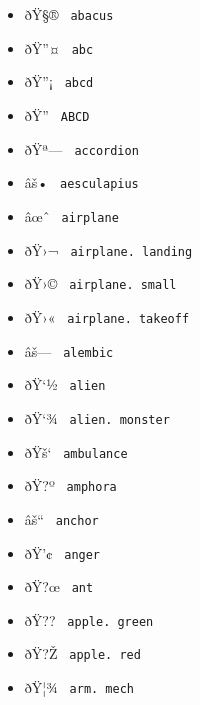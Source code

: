 \begin{itemize}
\tightlist
\item
  \label{symbol-abacus}{{ ðŸ§® } \texttt{\ abacus\ }}
\item
  \label{symbol-abc}{{ ðŸ''¤ } \texttt{\ abc\ }}
\item
  \label{symbol-abcd}{{ ðŸ''¡ } \texttt{\ abcd\ }}
\item
  \label{symbol-ABCD}{{ ðŸ'' } \texttt{\ ABCD\ }}
\item
  \label{symbol-accordion}{{ ðŸª--- }
  \texttt{\ accordion\ }}
\item
  \label{symbol-aesculapius}{{ âš• }
  \texttt{\ aesculapius\ }}
\item
  \label{symbol-airplane}{{ âœˆ } \texttt{\ airplane\ }}
\item
  \label{symbol-airplane.landing}{{ ðŸ›¬ }
  \texttt{\ airplane.\ landing\ }}
\item
  \label{symbol-airplane.small}{{ ðŸ›© }
  \texttt{\ airplane.\ small\ }}
\item
  \label{symbol-airplane.takeoff}{{ ðŸ›« }
  \texttt{\ airplane.\ takeoff\ }}
\item
  \label{symbol-alembic}{{ âš--- } \texttt{\ alembic\ }}
\item
  \label{symbol-alien}{{ ðŸ`½ } \texttt{\ alien\ }}
\item
  \label{symbol-alien.monster}{{ ðŸ`¾ }
  \texttt{\ alien.\ monster\ }}
\item
  \label{symbol-ambulance}{{ ðŸš` }
  \texttt{\ ambulance\ }}
\item
  \label{symbol-amphora}{{ ðŸ?º } \texttt{\ amphora\ }}
\item
  \label{symbol-anchor}{{ âš`` } \texttt{\ anchor\ }}
\item
  \label{symbol-anger}{{ ðŸ'¢ } \texttt{\ anger\ }}
\item
  \label{symbol-ant}{{ ðŸ?œ } \texttt{\ ant\ }}
\item
  \label{symbol-apple.green}{{ ðŸ?? }
  \texttt{\ apple.\ green\ }}
\item
  \label{symbol-apple.red}{{ ðŸ?Ž }
  \texttt{\ apple.\ red\ }}
\item
  \label{symbol-arm.mech}{{ ðŸ¦¾ }
  \texttt{\ arm.\ mech\ }}

\end{itemize}
